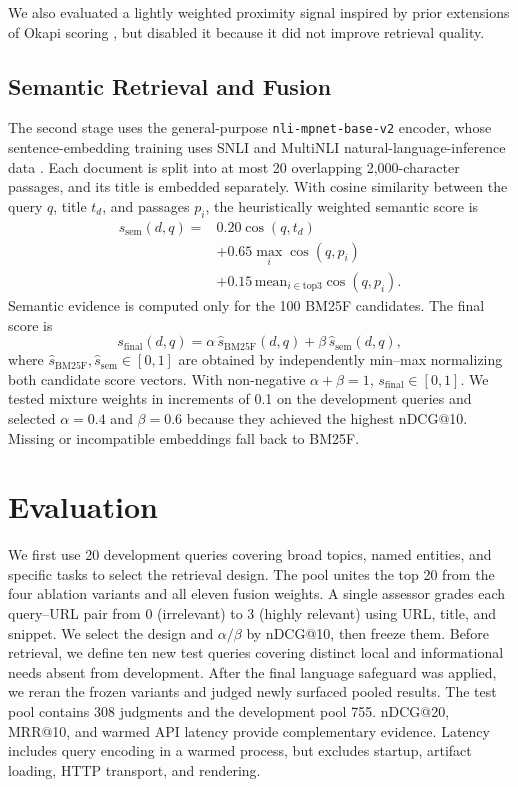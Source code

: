 \documentclass{article}
\begin{document}
We also evaluated a lightly weighted proximity signal inspired by prior
extensions of Okapi scoring \citep{rasolofo2003}, but disabled it because it did
not improve retrieval quality.

\subsection{Semantic Retrieval and Fusion}
The second stage uses the general-purpose
\texttt{nli-mpnet-base-v2} encoder, whose sentence-embedding training uses
SNLI and MultiNLI natural-language-inference data
\citep{nli-mpnet-base-v2}. Each document is split into at most 20 overlapping
2,000-character passages, and its title is embedded separately. With cosine
similarity between the query $q$, title $t_d$, and passages $p_i$, the
heuristically weighted semantic score is
\[
\begin{array}{rl}
s_{\mathrm{sem}}(d,q)={}&0.20\cos(q,t_d)\\
&+0.65\max_i\cos(q,p_i)\\
&+0.15\,\mathrm{mean}_{i\in\mathrm{top3}}\cos(q,p_i).
\end{array}
\]
Semantic evidence is computed only for the 100 BM25F candidates. The final
score is
\[
s_{\mathrm{final}}(d,q)=\alpha\,\hat{s}_{\mathrm{BM25F}}(d,q)
  +\beta\,\hat{s}_{\mathrm{sem}}(d,q),
\]
where $\hat{s}_{\mathrm{BM25F}},\hat{s}_{\mathrm{sem}}\in[0,1]$ are obtained
by independently min--max normalizing both candidate score vectors. With
non-negative $\alpha+\beta=1$, $s_{\mathrm{final}}\in[0,1]$. We tested mixture
weights in increments of 0.1 on the development queries and selected
$\alpha=0.4$ and $\beta=0.6$ because they achieved the highest nDCG@10.
Missing or incompatible embeddings fall back to BM25F.

\section{Evaluation}
We first use 20 development queries covering broad topics, named entities, and
specific tasks to select the retrieval design. The pool unites the top 20 from
the four ablation variants and all eleven fusion weights. A single assessor
grades each query--URL pair from 0 (irrelevant) to 3 (highly relevant) using
URL, title, and snippet. We select the design and
$\alpha/\beta$ by nDCG@10, then freeze them. Before retrieval, we define ten
new test queries covering distinct local and informational needs absent from
development. After the final language safeguard was applied, we reran the
frozen variants and judged newly surfaced pooled results. The test pool contains
308 judgments and the development pool 755. nDCG@20, MRR@10, and warmed API
latency provide complementary evidence.
Latency includes query encoding in a warmed process, but excludes startup,
artifact loading, HTTP transport, and rendering.
\end{document}
